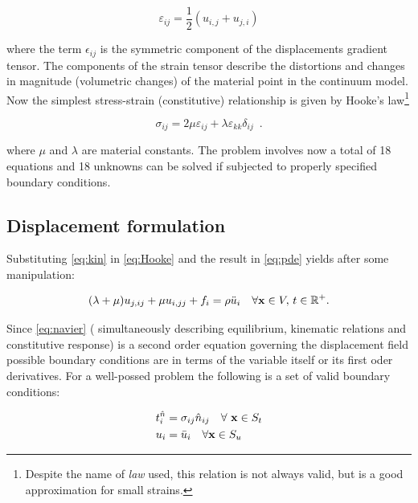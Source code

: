 \begin{equation}\label{eq:kin}
\varepsilon_{ij} = \frac{1}{2}(u_{i,j} + u_{j,i})
\end{equation}

where the term $\epsilon_{ij}$ is the symmetric component of the displacements gradient tensor. The components of the strain tensor describe the distortions and changes in magnitude (volumetric changes) of the material point in the continuum model. Now the simplest stress-strain (constitutive) relationship is given by Hooke's law\footnote{Despite the name of \emph{law} used, this relation is not always valid, but is a good approximation for small strains.}

\begin{equation} \label{eq:Hooke}
\sigma_{ij} = 2\mu \varepsilon_{ij} + \lambda \varepsilon_{kk}\delta_{ij} \enspace .
\end{equation}

where $\mu$ and $\lambda$ are material constants. The problem involves now a total of 18 equations and 18 unknowns can be solved if subjected to properly specified boundary conditions.

\subsection*{Displacement formulation}
Substituting \cref{eq:kin} in \cref{eq:Hooke} and the result in \cref{eq:pde} yields after some manipulation:

\begin{equation} \label{eq:navier}
(\lambda  + \mu)u_{j,ij} + \mu u_{i,jj} + {f_i} = \rho \ddot{u}_i \quad \forall \vb{x} \in V,\, t \in \mathbb{R}^{+}.
\end{equation}

Since \cref{eq:navier} ( simultaneously describing equilibrium, kinematic relations and constitutive response) is a second order equation governing the displacement field possible boundary conditions are in terms of the variable itself or its first oder derivatives. For a well-possed problem the following is a set of valid boundary conditions: 

\begin{equation} \label{eq:Wellbcs}
\begin{split}
&t_i^{\hat n} = \sigma _{ij} \hat n_{ij} \quad \forall\ \vb{x} \in S_t\\
& {u_i} = \bar{u}_i \quad \forall \vb x \in S_u
\end{split}
\end{equation}

